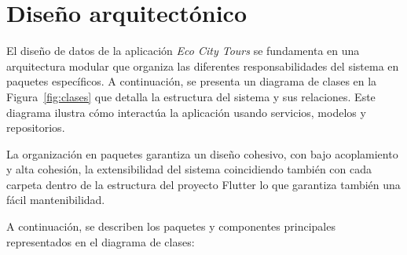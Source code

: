 \section{Diseño arquitectónico}

El diseño de datos de la aplicación \textit{Eco City Tours} se fundamenta en una arquitectura modular que organiza las diferentes responsabilidades del sistema en paquetes específicos. A continuación, se presenta un diagrama de clases en la Figura~\ref{fig:clases} que detalla la estructura del sistema y sus relaciones. Este diagrama ilustra cómo interactúa la aplicación usando servicios, modelos y repositorios. 

La organización en paquetes garantiza un diseño cohesivo, con bajo acoplamiento y alta cohesión, la extensibilidad del sistema coincidiendo también con cada carpeta dentro de la estructura del proyecto Flutter lo que garantiza también una fácil mantenibilidad.


A continuación, se describen los paquetes y componentes principales representados en el diagrama de clases:

